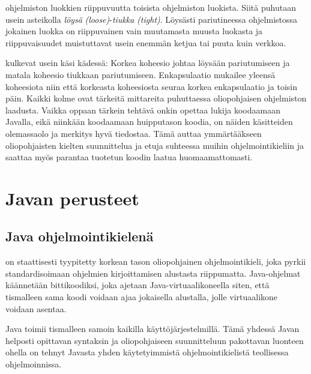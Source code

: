 \documentclass{tufte-book}
\newcommand{\eng}[1]{\textit{(#1)}}
\newcommand{\newnogls}[1]{\textit{#1}}
\newcommand{\newengnogls}[2]{\newnogls{#1} \eng{#2}}
\begin{document}
 ohjelmiston luokkien riippuvuutta toisista ohjelmiston
luokista. Siitä puhutaan usein asteikolla \newengnogls{löysä}{loose}-\newengnogls{tiukka}{tight}.
Löysästi pariutineessa ohjelmistossa jokainen luokka on riippuvainen vain muutamasta muusta
luokasta ja riippuvaisuudet muistuttavat usein enemmän ketjua tai puuta kuin verkkoa.

 kulkevat usein käsi kädessä: Korkea koheesio johtaa löysään
pariutumiseen ja matala koheesio tiukkaan pariutumiseen. Enkapsulaatio mukailee yleensä koheesiota
niin että korkeasta koheesiosta seuraa korkea enkapsulaatio ja toisin päin. Kaikki kolme ovat
tärkeitä mittareita puhuttaessa oliopohjaisen ohjelmiston laadusta. Vaikka oppaan tärkein tehtävä
onkin opettaa lukija koodaamaan Javalla, eikä niinkään koodaamaan huipputason koodia, on näiden
käsitteiden olemassaolo ja merkitys hyvä tiedostaa. Tämä auttaa ymmärtääkseen oliopohjaisten
kielten suunnittelua ja etuja suhteessa muihin ohjelmointikieliin ja saattaa myös parantaa
tuotetun koodin laatua huomaamattomasti.


\chapter{Javan perusteet}
\label{perusteet}


\section{Java ohjelmointikielenä}

 on staattisesti tyypitetty korkean tason oliopohjainen ohjelmointikieli, joka
pyrkii standardisoimaan ohjelmien kirjoittamisen alustasta riippumatta. Java-ohjelmat käännetään
bittikoodiksi, joka ajetaan Java-virtuaalikoneella siten, että tismalleen sama koodi voidaan ajaa
jokaisella alustalla, jolle virtuaalikone voidaan asentaa.

 Java toimii tismalleen samoin kaikilla käyttöjärjestelmillä. Tämä
yhdessä Javan helposti opittavan syntaksin ja oliopohjaiseen suunnitteluun pakottavan luonteen
ohella on tehnyt Javasta yhden käytetyimmistä ohjelmointikielistä teollisessa ohjelmoinnissa.
\end{document}
